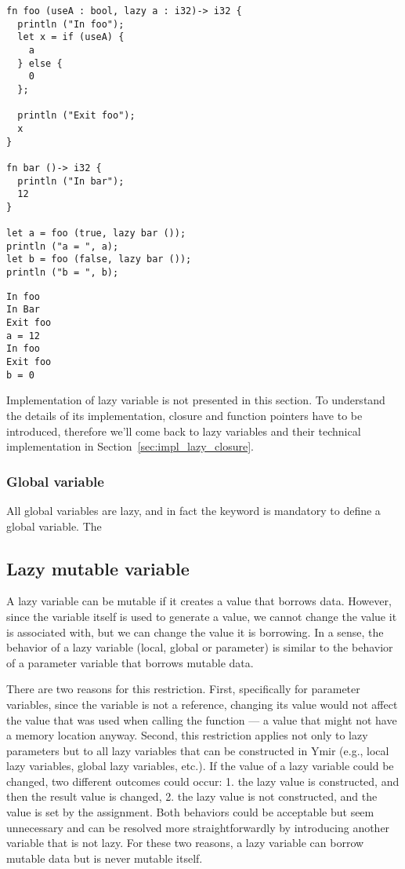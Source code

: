 \begin{lstlisting}[style=coloredverbatim, label=lst:accept_laziness, caption=Example of laziness contract acceptance]
fn foo (useA : bool, lazy a : i32)-> i32 {
  println ("In foo");
  let x = if (useA) {
    a
  } else {
    0
  };

  println ("Exit foo");
  x
}

fn bar ()-> i32 {
  println ("In bar");
  12
}

let a = foo (true, lazy bar ());
println ("a = ", a);
let b = foo (false, lazy bar ());
println ("b = ", b);
\end{lstlisting}

\begin{lstlisting}[style=intermediateVerb, caption=Result of execution of Listing~\ref{lst:accept_laziness}, label=lst:result_accept_laziness]
In foo
In Bar
Exit foo
a = 12
In foo
Exit foo
b = 0
\end{lstlisting}

Implementation of lazy variable is not presented in this section. To understand
the details of its implementation, closure and function pointers have to be
introduced, therefore we'll come back to lazy variables and their technical
implementation in Section~\ref{sec:impl_lazy_closure}.

\subsubsection*{Global variable}

All global variables are lazy, and in fact the keyword  is mandatory
to define a global variable. The

\subsection {Lazy mutable variable}
\label{sec:lazy_mut_param}

A lazy variable can be mutable if it creates a value that borrows data. However,
since the variable itself is used to generate a value, we cannot change the
value it is associated with, but we can change the value it is borrowing. In a
sense, the behavior of a lazy variable (local, global or parameter) is similar
to the behavior of a parameter variable that borrows mutable data.

There are two reasons for this restriction. First, specifically for parameter
variables, since the variable is not a reference, changing its value would not
affect the value that was used when calling the function — a value that might
not have a memory location anyway. Second, this restriction applies not only to
lazy parameters but to all lazy variables that can be constructed in Ymir (e.g.,
local lazy variables, global lazy variables, etc.). If the value of a lazy
variable could be changed, two different outcomes could occur: 1. the lazy value
is constructed, and then the result value is changed, 2. the lazy value is not
constructed, and the value is set by the assignment. Both behaviors could be
acceptable but seem unnecessary and can be resolved more straightforwardly by
introducing another variable that is not lazy. For these two reasons, a lazy
variable can borrow mutable data but is never mutable itself.

